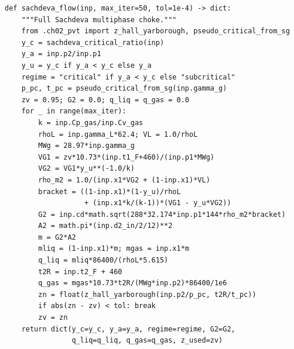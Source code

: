 \documentclass[10pt,a4paper,openany]{book}
\begin{document}
\begin{lstlisting}
def sachdeva_flow(inp, max_iter=50, tol=1e-4) -> dict:
    """Full Sachdeva multiphase choke."""
    from .ch02_pvt import z_hall_yarborough, pseudo_critical_from_sg
    y_c = sachdeva_critical_ratio(inp)
    y_a = inp.p2/inp.p1
    y_u = y_c if y_a < y_c else y_a
    regime = "critical" if y_a < y_c else "subcritical"
    p_pc, t_pc = pseudo_critical_from_sg(inp.gamma_g)
    zv = 0.95; G2 = 0.0; q_liq = q_gas = 0.0
    for _ in range(max_iter):
        k = inp.Cp_gas/inp.Cv_gas
        rhoL = inp.gamma_L*62.4; VL = 1.0/rhoL
        MWg = 28.97*inp.gamma_g
        VG1 = zv*10.73*(inp.t1_F+460)/(inp.p1*MWg)
        VG2 = VG1*y_u**(-1.0/k)
        rho_m2 = 1.0/(inp.x1*VG2 + (1-inp.x1)*VL)
        bracket = ((1-inp.x1)*(1-y_u)/rhoL
                   + (inp.x1*k/(k-1))*(VG1 - y_u*VG2))
        G2 = inp.cd*math.sqrt(288*32.174*inp.p1*144*rho_m2*bracket)
        A2 = math.pi*(inp.d2_in/2/12)**2
        m = G2*A2
        mliq = (1-inp.x1)*m; mgas = inp.x1*m
        q_liq = mliq*86400/(rhoL*5.615)
        t2R = inp.t2_F + 460
        q_gas = mgas*10.73*t2R/(MWg*inp.p2)*86400/1e6
        zn = float(z_hall_yarborough(inp.p2/p_pc, t2R/t_pc))
        if abs(zn - zv) < tol: break
        zv = zn
    return dict(y_c=y_c, y_a=y_a, regime=regime, G2=G2,
                q_liq=q_liq, q_gas=q_gas, z_used=zv)
\end{lstlisting}
\end{document}
